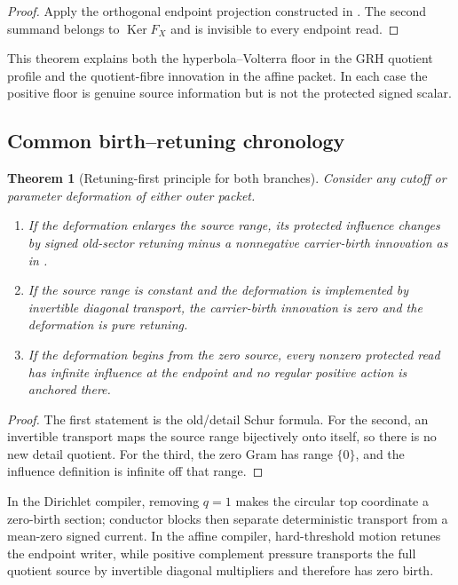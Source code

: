 \documentclass[11pt]{article}
\newtheorem{theorem}{Theorem}[section]
\theoremstyle{definition}
\theoremstyle{remark}
\newcommand{\Ker}{\operatorname{Ker}}
\begin{document}
\begin{proof}
Apply the orthogonal endpoint projection constructed in
.  The second summand belongs to $\Ker F_X$ and
is invisible to every endpoint read.
\end{proof}

This theorem explains both the hyperbola--Volterra floor in the GRH quotient
profile and the quotient-fibre innovation in the affine packet.  In each case
the positive floor is genuine source information but is not the protected
signed scalar.

\subsection{Common birth--retuning chronology}

\begin{theorem}[Retuning-first principle for both branches]
\label{thm:common-retuning}
Consider any cutoff or parameter deformation of either outer packet.
\begin{enumerate}[label=\textup{(R\arabic*)},leftmargin=3.2em]
\item If the deformation enlarges the source range, its protected influence
      changes by signed old-sector retuning minus a nonnegative carrier-birth
      innovation as in .
\item If the source range is constant and the deformation is implemented by
      invertible diagonal transport, the carrier-birth innovation is zero and
      the deformation is pure retuning.
\item If the deformation begins from the zero source, every nonzero protected
      read has infinite influence at the endpoint and no regular positive
      action is anchored there.
\end{enumerate}
\end{theorem}

\begin{proof}
The first statement is the old/detail Schur formula.  For the second, an
invertible transport maps the source range bijectively onto itself, so there is
no new detail quotient.  For the third, the zero Gram has range $\{0\}$, and
the influence definition is infinite off that range.
\end{proof}

In the Dirichlet compiler, removing $q=1$ makes the circular top coordinate a
zero-birth section; conductor blocks then separate deterministic transport
from a mean-zero signed current.  In the affine compiler, hard-threshold
motion retunes the endpoint writer, while positive complement pressure
transports the full quotient source by invertible diagonal multipliers and
therefore has zero birth.
\end{document}
